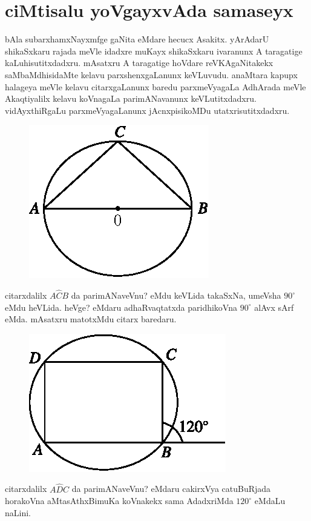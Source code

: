 \chapter{ciMtisalu yoVgayxvAda samaseyx} 

bAla subarxhamxNayxmfge gaNita eMdare hecucx Asakitx. yArAdarU shikaSxkaru rajada meVle idadxre muKayx shikaSxkaru ivaranunx A taragatige kaLuhisutitxdadxru. mAsatxru A taragatige hoVdare reVKAgaNitakekx saMbaMdhisidaMte kelavu parxshenxgaLanunx keVLuvudu. anaMtara kapupx halageya meVle kelavu citarxgaLanunx baredu parxmeVyagaLa AdhArada meVle Akaqtiyalilx kelavu koVnagaLa parimANavanunx keVLutitxdadxru. vidAyxthiRgaLu parxmeVyagaLanunx jAcnxpisikoMDu utatxrisutitxdadxru.
\begin{figure}[H]
\centering
\includegraphics[scale=0.7]{src/figures/m_179a.eps} 
\end{figure}
citarxdalilx $A\widehat{C}B$ da parimANaveVnu? eMdu keVLida takaSxNa, umeVsha $90^\circ$ eMdu heVLida. heVge? eMdaru adhaRvaqtatxda paridhikoVna $90^\circ$ alAvx sArf eMda. mAsatxru matotxMdu citarx baredaru.
\begin{figure}[H]
\centering
\includegraphics[scale=0.7]{src/figures/m_179b.eps}
\end{figure}
citarxdalilx $A\widehat{D}C$ da parimANaveVnu? eMdaru cakirxVya catuBuRjada hora\-koVna aMtasAthxBimuKa koVnakekx sama AdadxriMda $120^\circ$ eMdaLu naLini.
